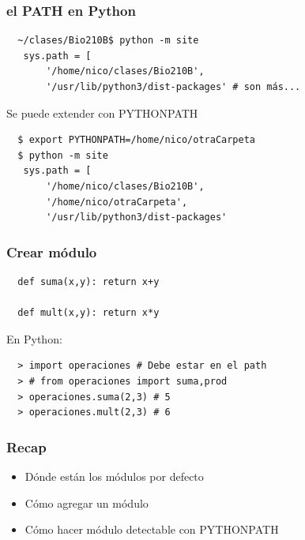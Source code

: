 \documentclass[14pt,aspectratio=169,xcolor=dvipsnames]{beamer}
\begin{document}
\begin{frame}[fragile]\frametitle{el PATH en Python}
    \begin{verbatim}
  ~/clases/Bio210B$ python -m site
   sys.path = [
       '/home/nico/clases/Bio210B',
       '/usr/lib/python3/dist-packages' # son más...
    \end{verbatim}

    \pause Se puede extender con PYTHONPATH
    \begin{verbatim}
  $ export PYTHONPATH=/home/nico/otraCarpeta
  $ python -m site
   sys.path = [
       '/home/nico/clases/Bio210B',
       '/home/nico/otraCarpeta',
       '/usr/lib/python3/dist-packages'
    \end{verbatim}

\end{frame}
\begin{frame}[fragile]\frametitle{Crear módulo}
    \begin{verbatim}
  def suma(x,y): return x+y

  def mult(x,y): return x*y
    \end{verbatim}

  En Python:
  \begin{verbatim}
  > import operaciones # Debe estar en el path
  > # from operaciones import suma,prod
  > operaciones.suma(2,3) # 5
  > operaciones.mult(2,3) # 6
  \end{verbatim}
\end{frame}
\begin{frame}\frametitle{Recap}
    \begin{itemize}
        \item Dónde están los módulos por defecto
        \item Cómo agregar un módulo
        \item Cómo hacer módulo detectable con PYTHONPATH
    \end{itemize}
\end{frame}
\begin{frame}
    \maketitle
\end{frame}
\end{document}
